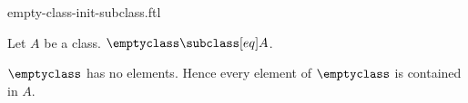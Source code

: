 \documentclass{article}
\begin{document}
\begin{smodule}[creators={Marcel Schütz}]{empty-class-init-subclass.ftl}

  \begin{fproposition*}[label=6931785090859008]
    Let $A$ be a class.
    $\emptyclass \subclass[eq] A$.
  \end{fproposition*}
  \begin{fproof}
    $\emptyclass$ has no elements.
    Hence every element of $\emptyclass$ is contained in $A$.
  \end{fproof}
\end{smodule}
\end{document}
